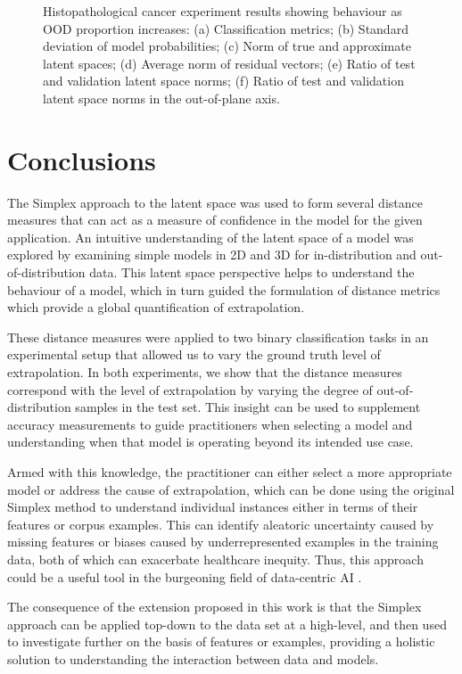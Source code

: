\documentclass{article}
\begin{document}
\begin{figure}[ht]
\caption{
Histopathological cancer experiment results showing behaviour as OOD proportion increases:
(a) Classification metrics; (b) Standard deviation of model probabilities; (c) Norm of true and approximate latent spaces;
(d) Average norm of residual vectors; (e) Ratio of test and validation latent space norms; (f) Ratio of test and validation latent space norms in the out-of-plane axis.
}
\label{fig:cancer_results_plots}
\end{figure}



\section{Conclusions}

The Simplex approach to the latent space was used to form several distance measures that can act as a measure of confidence in the model for the given application.
An intuitive understanding of the latent space of a model was explored by examining simple models in 2D and 3D for in-distribution and out-of-distribution data.
This latent space perspective helps to understand the behaviour of a model, which in turn guided the formulation of distance metrics which provide a global quantification of extrapolation.

These distance measures were applied to two binary classification tasks in an experimental setup that allowed us to vary the ground truth level of extrapolation.
In both experiments, we show that the distance measures correspond with the level of extrapolation by varying the degree of out-of-distribution samples in the test set.
This insight can be used to supplement accuracy measurements to guide practitioners when selecting a model and understanding when that model is operating beyond its intended use case.

Armed with this knowledge, the practitioner can either select a more appropriate model or address the cause of extrapolation, which can be done using the original Simplex method to understand individual instances either in terms of their features or corpus examples. This can identify aleatoric uncertainty caused by missing features or biases caused by underrepresented examples in the training data, both of which can exacerbate healthcare inequity. Thus, this approach could be a useful tool in the burgeoning field of data-centric AI \cite{zha_data-centric_2023}.

The consequence of the extension proposed in this work is that the Simplex approach can be applied top-down to the data set at a high-level, and then used to investigate further on the basis of features or examples, providing a holistic solution to understanding the interaction between data and models.
\end{document}
